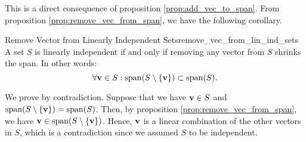 \begin{proof*}
	This is a direct consequence of proposition \ref{prop:add_vec_to_span}. From proposition \ref{prop:remove_vec_from_span}, we have the following corollary.
\end{proof*} 

\begin{corollary}{Remove Vector from Linearly Independent Sets}{remove_vec_from_lin_ind_sets}
	A set $S$ is linearly independent if and only if removing any vector from $S$ shrinks the span. In other words:
	\begin{equation}
		\forall{\bf v}\in S: \mathrm{span}(S\setminus\{{\bf v}\}) \subset \mathrm{span}(S).		
	\end{equation} 	
\end{corollary} 

\begin{proof*}
	We prove by contradiction. Suppose that we have ${\bf v}\in S$ and $\mathrm{span}(S\setminus\{{\bf v}\}) = \mathrm{span}(S)$. Then, by proposition \ref{prop:remove_vec_from_span}, we have ${\bf v}\in\mathrm{span}(S\setminus\{{\bf v}\})$. Hence, ${\bf v}$ is a linear combination of the other vectors in $S$, which is a contradiction since we assumed $S$ to be independent.
\end{proof*} 
